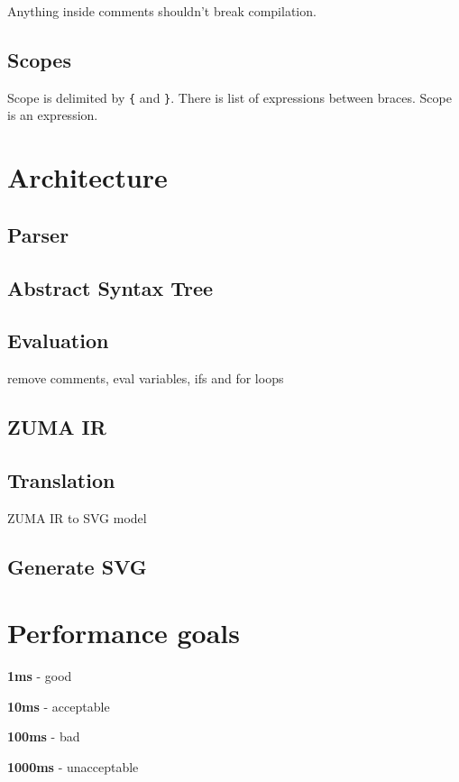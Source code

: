\documentclass{scrreprt}
\begin{document}
Anything inside comments shouldn't break compilation.

\section{Scopes}

Scope is delimited by \texttt{\{} and \texttt{\}}. There is list of expressions between braces. Scope is an expression.

\chapter{Architecture}

\section{Parser}

\section{Abstract Syntax Tree}

\section{Evaluation}

remove comments, eval variables, ifs and for loops

\section{ZUMA IR}

\section{Translation}

ZUMA IR to SVG model

\section{Generate SVG}

\chapter{Performance goals}

\textbf{1ms} - good

\textbf{10ms} - acceptable

\textbf{100ms} - bad

\textbf{1000ms} - unacceptable
\end{document}
